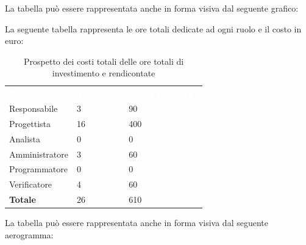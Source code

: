 La tabella può essere rappresentata anche in forma visiva dal seguente grafico:

La seguente tabella rappresenta le ore totali dedicate ad ogni ruolo e il costo in euro:

\begin{table}[!htbp]
\begin{center}
\renewcommand{\arraystretch}{1.5}
\begin{tabular}{ m{}<{\centering}  m{}<{\centering} m{}<{\centering}}
	\rowcolor{darkblue}
	\textcolor{white}{\textbf{Ruolo}}&\textcolor{white}{\textbf{Totale ore}}&\textcolor{white}{\textbf{Costo totale (\euro)}}\\ 

	Responsabile  & 3 & 90 \\	
	
	Progettista & 16 & 400 \\
	
	Analista & 0 & 0 \\

	Amministratore & 3 & 60 \\
	
	Programmatore & 0 & 0 \\
	
	Verificatore & 4 & 60 \\
	
	\textbf{Totale} & 26 & 610 \\
	
\end{tabular}
\caption{Prospetto dei costi totali delle ore totali di investimento e rendicontate}
\end{center}
\end{table}

La tabella può essere rappresentata anche in forma visiva dal seguente aerogramma:



